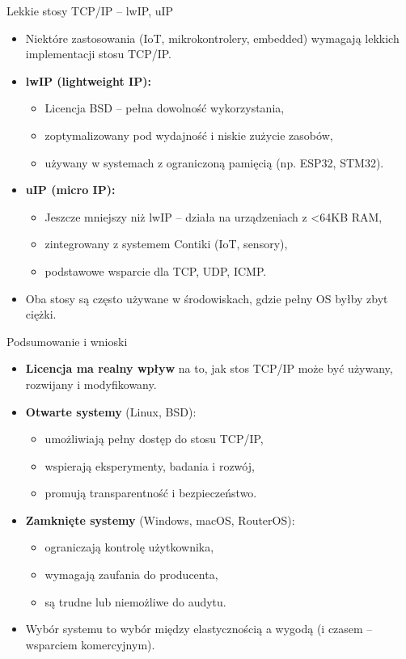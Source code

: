 \documentclass[aspectratio=169]{beamer}
\begin{document}
\begin{frame}{Lekkie stosy TCP/IP – lwIP, uIP}
  \begin{itemize}
    \item Niektóre zastosowania (IoT, mikrokontrolery, embedded) wymagają lekkich implementacji stosu TCP/IP.
    \item \textbf{lwIP (lightweight IP):}
    \begin{itemize}
      \item Licencja BSD – pełna dowolność wykorzystania,
      \item zoptymalizowany pod wydajność i niskie zużycie zasobów,
      \item używany w systemach z ograniczoną pamięcią (np. ESP32, STM32).
    \end{itemize}
    \item \textbf{uIP (micro IP):}
    \begin{itemize}
      \item Jeszcze mniejszy niż lwIP – działa na urządzeniach z <64KB RAM,
      \item zintegrowany z systemem Contiki (IoT, sensory),
      \item podstawowe wsparcie dla TCP, UDP, ICMP.
    \end{itemize}
    \item Oba stosy są często używane w środowiskach, gdzie pełny OS byłby zbyt ciężki.
  \end{itemize}
\end{frame}

\begin{frame}{Podsumowanie i wnioski}
  \begin{itemize}
    \item \textbf{Licencja ma realny wpływ} na to, jak stos TCP/IP może być używany, rozwijany i modyfikowany.
    \item \textbf{Otwarte systemy} (Linux, BSD):
    \begin{itemize}
      \item umożliwiają pełny dostęp do stosu TCP/IP,
      \item wspierają eksperymenty, badania i rozwój,
      \item promują transparentność i bezpieczeństwo.
    \end{itemize}
    \item \textbf{Zamknięte systemy} (Windows, macOS, RouterOS):
    \begin{itemize}
      \item ograniczają kontrolę użytkownika,
      \item wymagają zaufania do producenta,
      \item są trudne lub niemożliwe do audytu.
    \end{itemize}
    \item Wybór systemu to wybór między elastycznością a wygodą (i czasem – wsparciem komercyjnym).
  \end{itemize}
\end{frame}
\end{document}
